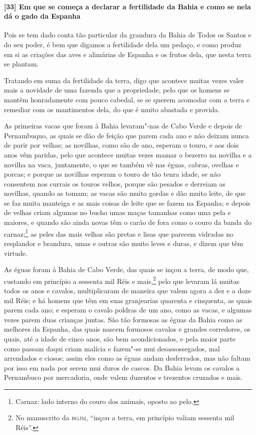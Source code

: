 \paragraph{[33] Em que se começa a declarar a fertilidade da Bahia e como se nela dá o gado
da Espanha}\quad
Pois se tem dado conta tão particular da grandura da Bahia de Todos os Santos e do seu
poder, é bem que digamos a fertilidade dela um pedaço, e como produz em si as criações das
aves e alimárias de Espanha e os frutos dela, que nesta terra se plantam.

Tratando em suma da fertilidade da terra, digo que acontece muitas vezes valer mais a
novidade de uma fazenda que a propriedade, pelo que os homens se mantêm honradamente com
pouco cabedal, se se querem acomodar com a terra e remediar com os mantimentos dela, do
que é muito abastada e provida.

As primeiras vacas que foram à Bahia levaram"-nas de Cabo Verde e depois de Pernambuquo, as
quais se dão de feição que parem cada ano e não deixam nunca de parir por velhas; as
novilhas, como são de ano, esperam o touro, e aos dois anos vêm paridas, pelo que acontece
muitas vezes mamar o bezerro na novilha e a novilha na vaca, juntamente, o que se também
vê nas éguas, cabras, ovelhas e porcas; e porque as novilhas esperam o touro de tão tenra
idade, se não consentem nos currais os touros velhos, porque são pesados e derreiam as
novilhas, quando as tomam; as vacas são muito gordas e dão muito leite, de que se faz
muita manteiga e as mais coisas de leite que se fazem na Espanha; e depois de velhas criam
algumas no bucho umas maças tamanhas como uma pela e maiores, e quando são ainda novas têm
o carão de fora como o couro da banda do carnaz;\footnote{ Carnaz: lado interno do couro
dos animais, oposto ao pelo.} as peles das mais velhas são pretas e lisas que parecem
vidradas no resplandor e brandura, umas e outras são muito leves e duras, e dizem que têm
virtude.

As éguas foram à Bahia de Cabo Verde, das quais se inçou a terra, de modo que, custando em
princípio a sessenta mil Réis e mais,\footnote{ No manuscrito da \textsc{bgjm}, ``inçou a
terra, em princípio valiam sessenta mil Réis''.} pelo que levaram lá muitas todos os anos
e cavalos, multiplicaram de maneira que valem agora a dez e a doze mil Réis; e há homens
que têm em suas granjearias quarenta e cinquenta, as quais parem cada ano; e esperam o
cavalo poldras de um ano, como as vacas, e algumas vezes parem duas crianças juntas. São
tão formosas as éguas da Bahia como as melhores da Espanha, das quais nascem formosos
cavalos e grandes corredores, os quais, até a idade de cinco anos, são bem acondicionados,
e pela maior parte como passam daqui criam malícia e fazem"-se mui desassossegados, mal
arrendados e ciosos; assim eles como as éguas andam desferrados, mas não faltam por isso
em nada por serem mui duros de cascos. Da Bahia levam os cavalos a Pernambuco por
mercadoria, onde valem duzentos e trezentos cruzados e mais.

